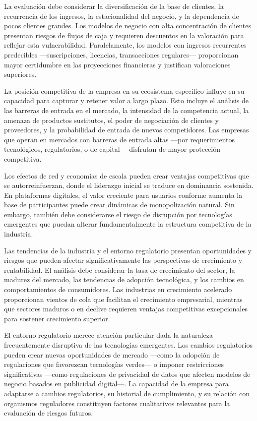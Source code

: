 La evaluación debe considerar la diversificación de la base de clientes, la recurrencia de los ingresos, la estacionalidad del negocio, y la dependencia de pocos clientes grandes. Los modelos de negocio con alta concentración de clientes presentan riesgos de flujos de caja y requieren descuentos en la valoración para reflejar esta vulnerabilidad. Paralelamente, los modelos con ingresos recurrentes predecibles ---suscripciones, licencias, transacciones regulares--- proporcionan mayor certidumbre en las proyecciones financieras y justifican valoraciones superiores.

La posición competitiva de la empresa en su ecosistema específico influye en su capacidad para capturar y retener valor a largo plazo. Esto incluye el análisis de las barreras de entrada en el mercado, la intensidad de la competencia actual, la amenaza de productos sustitutos, el poder de negociación de clientes y proveedores, y la probabilidad de entrada de nuevos competidores. Las empresas que operan en mercados con barreras de entrada altas ---por requerimientos tecnológicos, regulatorios, o de capital--- disfrutan de mayor protección competitiva.

Los efectos de red y economías de escala pueden crear ventajas competitivas que se autorreinfuerzan, donde el liderazgo inicial se traduce en dominancia sostenida. En plataformas digitales, el valor creciente para usuarios conforme aumenta la base de participantes puede crear dinámicas de monopolización natural. Sin embargo, también debe considerarse el riesgo de disrupción por tecnologías emergentes que puedan alterar fundamentalmente la estructura competitiva de la industria.

Las tendencias de la industria y el entorno regulatorio presentan oportunidades y riesgos que pueden afectar significativamente las perspectivas de crecimiento y rentabilidad. El análisis debe considerar la tasa de crecimiento del sector, la madurez del mercado, las tendencias de adopción tecnológica, y los cambios en comportamientos de consumidores. Las industrias en crecimiento acelerado proporcionan vientos de cola que facilitan el crecimiento empresarial, mientras que sectores maduros o en declive requieren ventajas competitivas excepcionales para sostener crecimiento superior.

El entorno regulatorio merece atención particular dada la naturaleza frecuentemente disruptiva de las tecnologías emergentes. Los cambios regulatorios pueden crear nuevas oportunidades de mercado ---como la adopción de regulaciones que favorezcan tecnologías verdes--- o imponer restricciones significativas ---como regulaciones de privacidad de datos que afecten modelos de negocio basados en publicidad digital---. La capacidad de la empresa para adaptarse a cambios regulatorios, su historial de cumplimiento, y su relación con organismos reguladores constituyen factores cualitativos relevantes para la evaluación de riesgos futuros.

